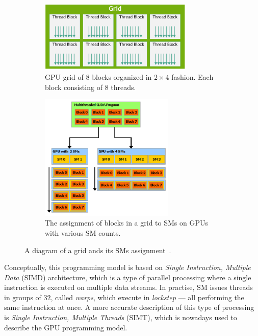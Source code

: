 \begin{figure}
	\centering
	\begin{subfigure}{.5\textwidth}
		\centering
        \includegraphics[width=0.8\textwidth]{img/grid}
        \caption{GPU grid of $8$ blocks organized in $2\times4$ fashion. Each block consisting of $8$ threads.}
        \label{fig:grid}
	\end{subfigure}%
	\begin{subfigure}{.5\textwidth}
		\centering
        \includegraphics[width=0.7\textwidth]{img/grid-sm}
        \caption{The assignment of blocks in a grid to SMs on GPUs with various SM counts.}
        \label{fig:grid-sm}
	\end{subfigure}
    \caption{A diagram of a grid ands its SMs assignment~\cite{site:cuda}.}
\end{figure}

Conceptually, this programming model is based on \emph{Single Instruction, Multiple Data} (SIMD) architecture, which is a type of parallel processing where a single instruction is executed on multiple data streams. In practise, SM issues threads in groups of $32$, called \emph{warps}, which execute in \emph{lockstep} --- all performing the same instruction at once. A more accurate description of this type of processing is \emph{Single Instruction, Multiple Threads} (SIMT), which is nowadays used to describe the GPU programming model.

